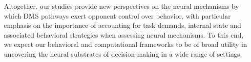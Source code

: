 Altogether, our studies provide new perspectives on the neural mechanisms by which DMS pathways exert opponent control over behavior, with particular emphasis on the importance of accounting for task demands, internal state and associated behavioral strategies when assessing neural mechanisms. To this end, we expect our behavioral and computational frameworks to be of broad utility in uncovering the neural substrates of decision-making in a wide range of settings.

